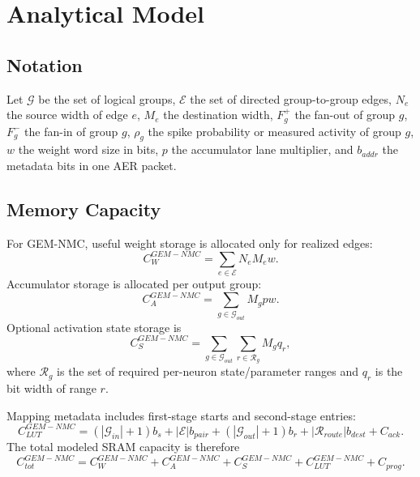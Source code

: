 \documentclass[10pt,conference]{IEEEtran}
\newcommand{\arch}{GEM-NMC}
\begin{document}
\section{Analytical Model}
\subsection{Notation}
Let $\mathcal{G}$ be the set of logical groups, $\mathcal{E}$ the set of directed group-to-group edges, $N_e$ the source width of edge $e$, $M_e$ the destination width, $F_g^+$ the fan-out of group $g$, $F_g^-$ the fan-in of group $g$, $\rho_g$ the spike probability or measured activity of group $g$, $w$ the weight word size in bits, $p$ the accumulator lane multiplier, and $b_{addr}$ the metadata bits in one AER packet.

\subsection{Memory Capacity}
For \arch{}, useful weight storage is allocated only for realized edges:
\begin{equation}
    C_{W}^{\arch} = \sum_{e\in\mathcal{E}} N_e M_e w.
\end{equation}
Accumulator storage is allocated per output group:
\begin{equation}
    C_{A}^{\arch} = \sum_{g\in\mathcal{G}_{out}} M_g p w.
\end{equation}
Optional activation state storage is
\begin{equation}
    C_{S}^{\arch} = \sum_{g\in\mathcal{G}_{out}} \sum_{r\in\mathcal{R}_g} M_g q_r,
\end{equation}
where $\mathcal{R}_g$ is the set of required per-neuron state/parameter ranges and $q_r$ is the bit width of range $r$.

Mapping metadata includes first-stage starts and second-stage entries:
\begin{equation}
    C_{LUT}^{\arch} = (|\mathcal{G}_{in}|+1)b_s + |\mathcal{E}|b_{pair} + (|\mathcal{G}_{out}|+1)b_r + |\mathcal{R}_{route}|b_{dest} + C_{ack}.
\end{equation}
The total modeled SRAM capacity is therefore
\begin{equation}
    C_{tot}^{\arch}=C_W^{\arch}+C_A^{\arch}+C_S^{\arch}+C_{LUT}^{\arch}+C_{prog}.
\end{equation}
\end{document}
